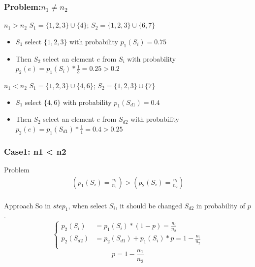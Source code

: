 \documentclass[notheorems, aspectratio=54]{beamer}
\begin{document}
\begin{frame}
    \frametitle{Problem:$n_1 \neq n_2$}
    \begin{block}{$n_1 > n_2$}
        $S_1 =  \{1,2,3\} \cup \{4\}$; $S_2 = \{1,2,3\} \cup \{6,7\}$
        \begin{itemize}
            \item $S_1$ select $\{1,2,3\}$ with probability $p_1(S_i) = 0.75$
            \item Then $S_2$ select an element $e$ from $S_i$ with probability $p_2(e) = p_1(S_i)*\frac{1}{3} = 0.25 > 0.2$
        \end{itemize}
    \end{block}
    \begin{block}{$n_1 < n_2$}
        $S_1 =  \{1,2,3\} \cup \{4,6\}$; $S_2 = \{1,2,3\} \cup \{7\}$
        \begin{itemize}
            \item $S_1$ select $\{4,6\}$ with probability $p_1(S_{d1}) = 0.4$
            \item Then $S_2$ select an element $e$ from $S_{d2}$ with probability $p_2(e) = p_1(S_{d1})*\frac{1}{1} = 0.4 > 0.25$
        \end{itemize}
    \end{block}
\end{frame}

\begin{frame}
    \frametitle{Case1: n1 < n2}
    \begin{block}{Problem}
        \begin{equation}
            \begin{aligned}
                (p_1(S_i) = \frac{n_i}{n_1}) > (p_2(S_i) = \frac{n_i}{n_2}) \\
            \end{aligned}
        \end{equation}
    \end{block}
    \begin{block}{Approach}
        So in $step_1$, when select $S_i$, it should be changed $S_{d2}$ in probability of $p$. \\
        \begin{equation}
            \left\{
            \begin{aligned}
                    p_2(S_i) &= p_1(S_i)*(1-p) = \frac{n_i}{n_2} \\
                    p_2(S_{d2}) &= p_2(S_{d1})+p_1(S_i)*{p} = 1-\frac{n_i}{n_2} \\
            \end{aligned}
            \right. 
        \end{equation}
        \begin{equation}
            p = 1-\frac{n_1}{n_2}
        \end{equation}
    \end{block}
\end{frame}
\end{document}
